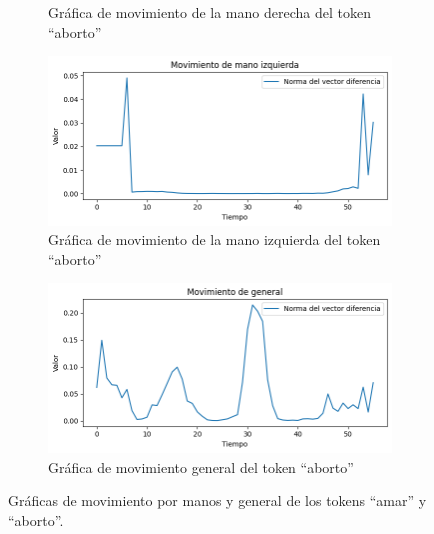 \begin{figure}[t]
\begin{subfigure}[t]{0.3\textwidth}
		\caption{Gráfica de movimiento de la mano derecha del token ``aborto''}
		\label{f:rhand_movediff_aborto}
	\end{subfigure}
	\begin{subfigure}[t]{0.3\textwidth}
	\centering
		\includegraphics[align=t,width=0.9\linewidth, height=0.9\linewidth]{Graphics/aborto_lhand_movediff_original_nu.png}
		\caption{Gráfica de movimiento de la mano izquierda del token ``aborto''}
		\label{f:lhand_movediff_aborto}
	\end{subfigure}
	\begin{subfigure}[t]{0.3\textwidth}
	\centering
		\includegraphics[align=t,width=0.9\linewidth, height=0.9\linewidth]{Graphics/aborto_global_movediff_original_nu.png}
		\caption{Gráfica de movimiento general del token ``aborto''}
		\label{f:general_movediff_aborto}
	\end{subfigure}
	\caption{Gráficas de movimiento por manos y general de los tokens ``amar'' y ``aborto''.}
	\label{f:movediff_aborto_amar}
\end{figure}


